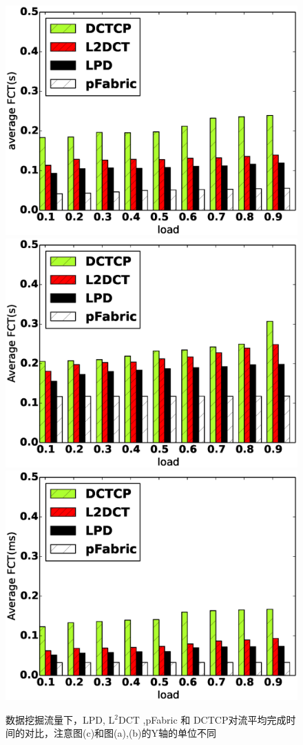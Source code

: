 \begin{figure}[h]
\centering
{}
 {\includegraphics[width=0.32\columnwidth]{figures/LPD/spineleaf/FCT_DATA_average.eps}}
{\includegraphics[width=0.32\columnwidth]{figures/LPD/spineleaf/FCT_DATA_large.eps}}
{\includegraphics[width=0.32\columnwidth]{figures/LPD/spineleaf/FCT_DATA_small.eps}}
\caption{数据挖掘流量下，LPD, L$^2$DCT ,pFabric 和 DCTCP对流平均完成时间的对比，注意图(c)和图(a),(b)的Y轴的单位不同}
\label{fct-spine-data-5-fig}
\end{figure}


